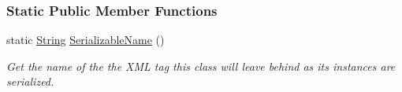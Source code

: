 \subsubsection*{Static Public Member Functions}
\begin{DoxyCompactItemize}
\item 
static \hyperlink{namespaceMezzanine_acf9fcc130e6ebf08e3d8491aebcf1c86}{String} \hyperlink{classMezzanine_1_1NonStaticWorldObject_a015b0e13455f960e9eaaa420f0802395}{SerializableName} ()
\begin{DoxyCompactList}\small\item\em Get the name of the the XML tag this class will leave behind as its instances are serialized. \item\end{DoxyCompactList}\end{DoxyCompactItemize}
